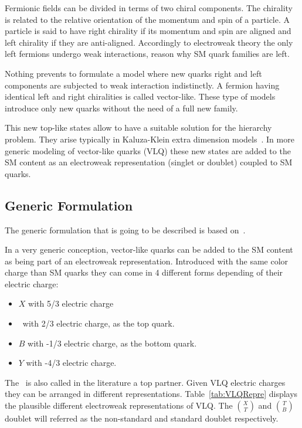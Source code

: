 Fermionic fields can be divided in terms of two chiral components. The chirality is related to the relative orientation of the momentum and spin of a particle. A particle is said to have right chirality if its momentum and spin are aligned and left chirality if they are anti-aligned.  Accordingly to electroweak theory the only left fermions undergo weak interactions, reason why SM quark families are left. 

Nothing prevents to formulate a model where new quarks right and left components are subjected to weak interaction indistinctly. A fermion having identical left and right chiralities is called vector-like. These type of models introduce only new quarks without the need of a full new family.

This new top-like states allow to have a suitable solution for the hierarchy problem. They arise typically in Kaluza-Klein extra dimension models~\cite{Contino:2006qr, Matsedonskyi:2012ym, Dissertori:2010ug}. In more generic modeling of vector-like quarks (VLQ) these new states are added to the SM content as an electroweak representation (singlet or doublet) coupled to SM quarks.

\subsection{Generic Formulation}
\label{sec:form}

The generic formulation that is going to be described is based on~\cite{Buchkremer:2013bha, Cacciapaglia:2011fx}.

In a very generic conception, vector-like quarks can be added to the SM content as being part of an electroweak representation. Introduced with the same color charge than SM quarks they can come in 4 different forms depending of their electric charge:
\begin{itemize}
\item $X$ with 5/3 electric charge
\item \Tp~with 2/3 electric charge, as the top quark.
\item $B$ with -1/3 electric charge, as the bottom quark.
\item $Y$ with -4/3 electric charge.
\end{itemize}

The \Tp~is also called in the literature a top partner. Given VLQ electric charges they can be arranged in different representations. Table~\ref{tab:VLQRepre} displays the plausible different electroweak representations of VLQ. The $\binom{X}{T}$ and $\binom{T}{B}$ doublet will referred as the non-standard and standard doublet respectively.  

